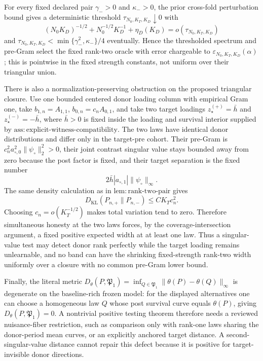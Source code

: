 For every fixed declared pair \(\gamma_->0\) and \(\kappa_->0\), the prior cross-fold perturbation bound gives a deterministic threshold \(\tau_{N_0,K_T,K_D}\downarrow0\) with
\[
 (N_0K_D)^{-1/2}+N_0^{-1/2}K_D^{-1}+\eta_D(K_D)
 =o(\tau_{N_0,K_T,K_D})
\]
and \(\tau_{N_0,K_T,K_D}<\min\{\gamma_-^2,\kappa_-\}/4\) eventually.  Hence the thresholded spectrum and pre-Gram select the fixed rank-two oracle with error chargeable to \(\varepsilon_{N_0,K_T,K_D}(\alpha)\); this is pointwise in the fixed strength constants, not uniform over their triangular union.

There is also a normalization-preserving obstruction on the proposed triangular closure.  Use one bounded centered donor loading column with empirical Gram one, take \(b_{1,n}=A_{1,1}\), \(b_{0,n}=c_nA_{0,1}\), and take two target loadings \(z_{\star}^{(+)}=\bar h\) and \(z_{\star}^{(-)}=-\bar h\), where \(\bar h>0\) is fixed inside the loading and survival interior supplied by \(\mathrm{ass:explicit\mbox{-}witness\mbox{-}compatibility}\).  The two laws have identical donor distributions and differ only in the target-pre cohort.  Their pre-Gram is \(c_n^2a_{\circ,0}^2\|\psi_\circ\|_2^2>0\), their joint contrast singular value stays bounded away from zero because the post factor is fixed, and their target separation is the fixed number
\[
 2\bar h|a_{\circ,1}|\|\psi_\circ\|_\infty.
\]
The same density calculation as in \(\mathrm{lem:rank\mbox{-}two\mbox{-}pair}\) gives
\[
 D_{\mathrm{KL}}(P_{n,+}\|P_{n,-})
 \le C K_Tc_n^2.
\]
Choosing \(c_n=o(K_T^{-1/2})\) makes total variation tend to zero.  Therefore simultaneous honesty at the two laws forces, by the coverage-intersection argument, a fixed positive expected width at at least one law.  Thus a singular-value test may detect donor rank perfectly while the target loading remains unlearnable, and no band can have the shrinking fixed-strength rank-two width uniformly over a closure with no common pre-Gram lower bound.

Finally, the literal metric \(D_\theta(P,\mathfrak P_1)=\inf_{Q\in\mathfrak P_1}\|\theta(P)-\theta(Q)\|_\infty\) is degenerate on the baseline-rich frozen model: for the displayed alternatives one can choose a homogeneous law \(Q\) whose post survival curve equals \(\theta(P)\), giving \(D_\theta(P,\mathfrak P_1)=0\).  A nontrivial positive testing theorem therefore needs a reviewed nuisance-fiber restriction, such as comparison only with rank-one laws sharing the donor-period mean curves, or an explicitly anchored target distance.  A second-singular-value distance cannot repair this defect because it is positive for target-invisible donor directions.